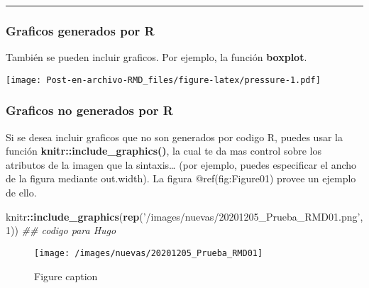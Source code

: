\documentclass[]{article}
\newenvironment{Shaded}{\begin{snugshade}}{\end{snugshade}}
\newcommand{\CommentTok}[1]{\textcolor[rgb]{0.56,0.35,0.01}{\textit{#1}}}
\newcommand{\DataTypeTok}[1]{\textcolor[rgb]{0.13,0.29,0.53}{#1}}
\newcommand{\DecValTok}[1]{\textcolor[rgb]{0.00,0.00,0.81}{#1}}
\newcommand{\KeywordTok}[1]{\textcolor[rgb]{0.13,0.29,0.53}{\textbf{#1}}}
\newcommand{\NormalTok}[1]{#1}
\newcommand{\OperatorTok}[1]{\textcolor[rgb]{0.81,0.36,0.00}{\textbf{#1}}}
\newcommand{\StringTok}[1]{\textcolor[rgb]{0.31,0.60,0.02}{#1}}
\begin{document}
\begin{center}\rule{0.5\linewidth}{\linethickness}\end{center}

\hypertarget{graficos-generados-por-r}{%
\subsubsection{Graficos generados por
R}\label{graficos-generados-por-r}}

También se pueden incluir graficos. Por ejemplo, la función
\textbf{boxplot}.

\begin{Shaded}
\end{Shaded}

\texttt{[image: Post-en-archivo-RMD\_files/figure-latex/pressure-1.pdf]}

\hypertarget{graficos-no-generados-por-r}{%
\subsubsection{Graficos no generados por
R}\label{graficos-no-generados-por-r}}

Si se desea incluir graficos que no son generados por codigo R, puedes
usar la función \textbf{knitr::include\_graphics()}, la cual te da mas
control sobre los atributos de la imagen que la sintaxis\ldots{} (por
ejemplo, puedes especificar el ancho de la figura mediante out.width).
La figura @ref(fig:Figure01) provee un ejemplo de ello.

\begin{Shaded}
\begin{Highlighting}[]
\NormalTok{knitr}\OperatorTok{::}\KeywordTok{include_graphics}\NormalTok{(}\KeywordTok{rep}\NormalTok{(}\StringTok{'/images/nuevas/20201205_Prueba_RMD01.png'}\NormalTok{, }\DecValTok{1}\NormalTok{)) }\CommentTok{## codigo para Hugo}
\end{Highlighting}
\end{Shaded}

\begin{figure}

{\centering \texttt{[image: /images/nuevas/20201205\_Prueba\_RMD01]} 

}

\caption{Figure caption}\label{fig:Figure01}
\end{figure}
\end{document}
